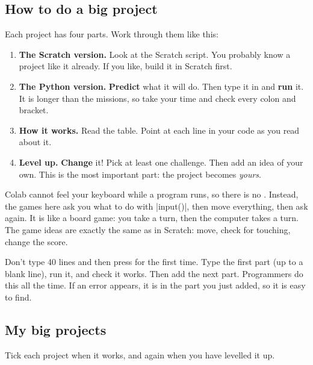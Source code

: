 \subsection*{How to do a big project}
Each project has four parts. Work through them like this:
\begin{enumerate}[label=\textbf{\arabic*.}]
  \item \textbf{The Scratch version.} Look at the Scratch script. You probably know a project like it already. If you like, build it in Scratch first.
  \item \textbf{The Python version.} \textbf{Predict} what it will do. Then type it in and \textbf{run} it. It is longer than the missions, so take your time and check every colon and bracket.
  \item \textbf{How it works.} Read the table. Point at each line in your code as you read about it.
  \item \textbf{Level up.} \textbf{Change} it! Pick at least one challenge. Then add an idea of your own. This is the most important part: the project becomes \emph{yours}.
\end{enumerate}

\begin{think}
Colab cannot feel your keyboard while a program runs, so there is no . Instead, the games here ask you what to do with \py|input()|, then move everything, then ask again. It is like a board game: you take a turn, then the computer takes a turn. The game ideas are exactly the same as in Scratch: move, check for touching, change the score.
\end{think}

\begin{watchout}
Don't type 40 lines and then press \playbtn{} for the first time. Type the first part (up to a blank line), run it, and check it works. Then add the next part. Programmers do this all the time. If an error appears, it is in the part you just added, so it is easy to find.
\end{watchout}

\subsection*{My big projects}
Tick each project when it works, and again when you have levelled it up.

